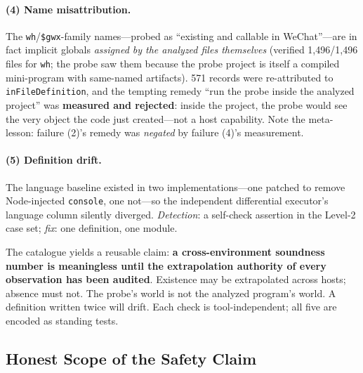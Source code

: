 \documentclass[sigconf,nonacm]{acmart}
\begin{document}
\paragraph{(4) Name misattribution.} The \texttt{wh}/\texttt{\$gwx}-family names---probed as ``existing and callable in WeChat''---are in fact implicit globals \emph{assigned by the analyzed files themselves} (verified 1{,}496/1{,}496 files for \texttt{wh}; the probe saw them because the probe project is itself a compiled mini-program with same-named artifacts). 571 records were re-attributed to \texttt{inFileDefinition}, and the tempting remedy ``run the probe inside the analyzed project'' was \textbf{measured and rejected}: inside the project, the probe would see the very object the code just created---not a host capability. Note the meta-lesson: failure (2)'s remedy was \emph{negated} by failure (4)'s measurement.

\paragraph{(5) Definition drift.} The language baseline existed in two implementations---one patched to remove Node-injected \texttt{console}, one not---so the independent differential executor's language column silently diverged. \emph{Detection}: a self-check assertion in the Level-2 case set; \emph{fix}: one definition, one module.

The catalogue yields a reusable claim: \textbf{a cross-environment soundness number is meaningless until the extrapolation authority of every observation has been audited}. Existence may be extrapolated across hosts; absence must not. The probe's world is not the analyzed program's world. A definition written twice will drift. Each check is tool-independent; all five are encoded as standing tests.

\subsection{Honest Scope of the Safety Claim}
\end{document}
